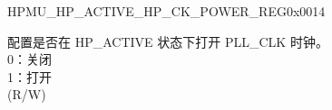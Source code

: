 \begin{register}{H}{PMU\_HP\_ACTIVE\_HP\_CK\_POWER\_REG}{0x0014}\label{regdesc:PMUHPACTIVEHPCKPOWERREG}
%
%
%
\regnewline%
\begin{regdesc}\begin{reglist}
\label{fielddesc:PMUHPACTIVEXPDBBPLL}\item [PMU\_HP\_ACTIVE\_XPD\_BBPLL] 配置是否在 HP\_ACTIVE 状态下打开 PLL\_CLK 时钟。 \\
0：关闭\\
1：打开\\
(R/W)
\end{reglist}\end{regdesc}
\end{register}

